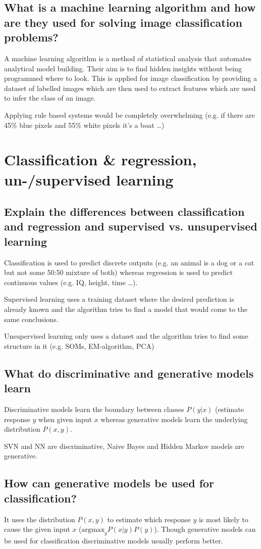 \subsection{What is a machine learning algorithm and how are they used for solving image classification problems?}
A machine learning algorithm is a method of statistical analysis that automates analytical model building. Their aim is to find hidden insights without being programmed where to look. 
This is applied for image classification by providing a dataset of labelled images which are then used to extract features which are used to infer the class of an image. 

Applying rule based systems would be completely overwhelming (e.g. if there are 45\% blue pixels and 55\% white pixels it's a boat \ldots)
%
\section{Classification \& regression, un-/supervised learning}
\subsection{Explain the differences between classification and regression and supervised vs. unsupervised learning}
Classification is used to predict discrete outputs (e.g. an animal is a dog or a cat but not some 50:50 mixture of both) whereas regression is used to predict continuous values (e.g. IQ, height, time \ldots).

Supervised learning uses a training dataset where the desired prediction is already known and the algorithm tries to find a model that would come to the same conclusions. 

Unsupervised learning only uses a dataset and the algorithm tries to find some structure in it (e.g. SOMs, EM-algorithm, PCA)
\subsection{What do discriminative and generative models learn }
Discriminative models learn the boundary between classes $P(y|x)$ (estimate response $y$ when given input $x$ whereas generative models learn the underlying distribution $P(x,y)$.

SVN and NN are discriminative, Naive Bayes and Hidden Markov models are generative.
\subsection{How can generative models be used for classification?}
It uses the distribution $P(x,y)$ to estimate which response $y$ is most likely to cause the given input $x$ ($\text{argmax}_y P(x|y)P(y)$). Though generative models can be used for classification discriminative models usually perform better. 
%
